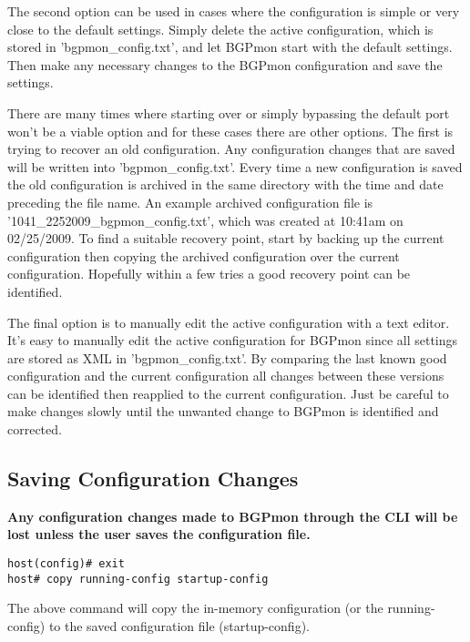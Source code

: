 The second option can be used in cases where the configuration is simple or very close to the default settings.  Simply delete the active configuration, which is stored in 'bgpmon\_config.txt', and let BGPmon start with the default settings.  Then make any necessary changes to the BGPmon configuration and save the settings.

There are many times where starting over or simply bypassing the default port won't be a viable option and for these cases there are other options. The first is trying to recover an old configuration.  Any configuration changes that are saved will be written into 'bgpmon\_config.txt'.  Every time a new configuration is saved the old configuration is archived in the same directory with the time and date preceding the file name.  An example archived configuration file is '1041\_2252009\_bgpmon\_config.txt', which was created at 10:41am on 02/25/2009.  To find a suitable recovery point, start by backing up the current configuration then copying the archived configuration over the current configuration.  Hopefully within a few tries a good recovery point can be identified. 

The final option is to manually edit the active configuration with a text editor.  It's easy to manually edit the active configuration for BGPmon since all settings are stored as XML in 'bgpmon\_config.txt'.  By comparing the last known good configuration and the current configuration all changes between these versions can be identified then reapplied to the current configuration.  Just be careful to make changes slowly until the unwanted change to BGPmon is identified and corrected.

\subsection{Saving Configuration Changes}
\label{sec:configure:save}

\textbf{Any configuration changes made to BGPmon through the CLI will be lost unless the user saves the configuration file.}

\begin{Verbatim}[frame=single]
host(config)# exit
host# copy running-config startup-config
\end{Verbatim}

The above command will copy the in-memory configuration (or the running-config) to the saved configuration file (startup-config).

